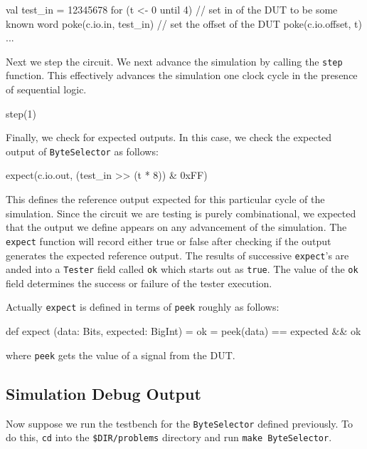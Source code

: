 \begin{scala}
val test_in = 12345678
for (t <- 0 until 4) {
  // set in of the DUT to be some known word
  poke(c.io.in,     test_in)
  // set the offset of the DUT
  poke(c.io.offset, t)
  ...
}
\end{scala}

Next we step the circuit.  We next advance the simulation by calling the \verb+step+ function. This effectively advances the simulation one clock cycle in the presence of sequential logic. 

\begin{scala}
step(1)
\end{scala}

Finally, we check for expected outputs.
In this case, we check the expected output of \verb+ByteSelector+ as follows:

\begin{scala}
expect(c.io.out, (test_in >> (t * 8)) & 0xFF)
\end{scala}

This defines the reference output expected for this particular cycle of the simulation. Since the circuit we are testing is purely combinational, we expected that the output we define appears on any advancement of the simulation.  The \verb+expect+ function will record either true or false after checking if the output generates the expected reference output. The results of successive \verb+expect+'s are anded into a \verb+Tester+ field called \verb+ok+ which starts out as \verb+true+.  The value of the \verb+ok+ field determines the success or failure of the tester execution.

Actually \verb+expect+ is defined in terms of \verb+peek+ roughly as follows:

\begin{scala}
def expect (data: Bits, expected: BigInt) = 
  ok = peek(data) == expected && ok
\end{scala}

where \verb+peek+ gets the value of a signal from the DUT.

\subsection{Simulation Debug Output}

Now suppose we run the testbench for the \verb+ByteSelector+ defined previously. To do this, \verb+cd+ into the \verb+$DIR/problems+ directory and run \verb+make ByteSelector+.

